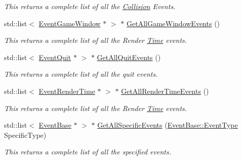 \begin{DoxyCompactItemize}
\begin{DoxyCompactList}\small\item\em This returns a complete list of all the \hyperlink{classMezzanine_1_1Collision}{Collision} Events. \item\end{DoxyCompactList}\item 
std::list$<$ \hyperlink{classMezzanine_1_1EventGameWindow}{EventGameWindow} $\ast$ $>$ $\ast$ \hyperlink{classMezzanine_1_1EventManager_abd6f4de517d07ab7a1a0c330c4e29032}{GetAllGameWindowEvents} ()
\begin{DoxyCompactList}\small\item\em This returns a complete list of all the Render \hyperlink{structMezzanine_1_1Time}{Time} events. \item\end{DoxyCompactList}\item 
std::list$<$ \hyperlink{classMezzanine_1_1EventQuit}{EventQuit} $\ast$ $>$ $\ast$ \hyperlink{classMezzanine_1_1EventManager_ae54b0f6e266c738ceb2b5192d2412a38}{GetAllQuitEvents} ()
\begin{DoxyCompactList}\small\item\em This returns a complete list of all the quit events. \item\end{DoxyCompactList}\item 
std::list$<$ \hyperlink{classMezzanine_1_1EventRenderTime}{EventRenderTime} $\ast$ $>$ $\ast$ \hyperlink{classMezzanine_1_1EventManager_a671df48c725e661274f21751ab2ec2f9}{GetAllRenderTimeEvents} ()
\begin{DoxyCompactList}\small\item\em This returns a complete list of all the Render \hyperlink{structMezzanine_1_1Time}{Time} events. \item\end{DoxyCompactList}\item 
std::list$<$ \hyperlink{classMezzanine_1_1EventBase}{EventBase} $\ast$ $>$ $\ast$ \hyperlink{classMezzanine_1_1EventManager_af149e3c8893bdd214d4c1d6aea5388b2}{GetAllSpecificEvents} (\hyperlink{classMezzanine_1_1EventBase_ab85e31e97753b7e7ecb098f82526baef}{EventBase::EventType} SpecificType)
\begin{DoxyCompactList}\small\item\em This returns a complete list of all the specified events. \item\end{DoxyCompactList}\item 

\end{DoxyCompactItemize}
